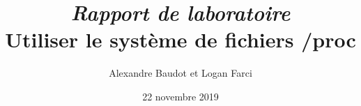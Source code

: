 \documentclass[french, a4, 12pt]{article}
\begin{document}
\cfoot{ } %
\rfoot{\thepage} %
\renewcommand{\headrulewidth}{0.4pt} 
\renewcommand{\footrulewidth}{0.4pt} 

\setcounter{tocdepth}{5}    %
\setcounter{secnumdepth}{5} %

\title{\emph{\textbf{Rapport de laboratoire}}\\Utiliser le système de fichiers /proc}
\author{Alexandre Baudot et Logan Farci}
\date{22 novembre 2019}
\maketitle
\newpage

\tableofcontents

\newpage

\newpage

\newpage

\newpage

\newpage

\end{document}
